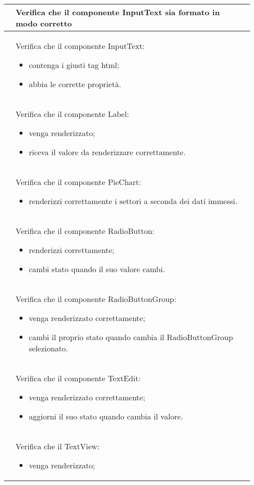 \begin{longtable}{|c|P{9cm}|c|}
	\hline {} & Verifica che il componente InputText sia formato in modo corretto  \\
	\hline {} & Verifica che il componente InputText:
	\begin{itemize}
		\item contenga i giusti tag html;
		\item abbia le corrette proprietà.
	\end{itemize}
	 \\
	\hline {} & Verifica che il componente Label:
	\begin{itemize}
		\item venga renderizzato;
		\item riceva il valore da renderizzare correttamente.
	\end{itemize}
	 \\
	\hline {} & Verifica che il componente PieChart:
	\begin{itemize}
		\item renderizzi correttamente i settori a seconda dei dati immessi.
	\end{itemize}
	 \\
	\hline {} & Verifica che il componente RadioButton:
	\begin{itemize}
		\item renderizzi correttamente;
		\item cambi stato quando il suo valore cambi.
	\end{itemize}
	 \\
	\hline {} & Verifica che il componente RadioButtonGroup:
	\begin{itemize}
		\item venga renderizzato correttamente;
		\item cambi il proprio stato quando cambia il RadioButtonGroup selezionato.
	\end{itemize}
	 \\
	\hline {} & Verifica che il componente TextEdit:
	\begin{itemize}
		\item venga renderizzato correttamente;
		\item aggiorni il suo stato quando cambia il valore.
	\end{itemize}
	 \\
	\hline {}\label{tu-textview} & Verifica che il TextView:
	\begin{itemize}
		\item venga renderizzato;

\end{itemize}
\end{longtable}
